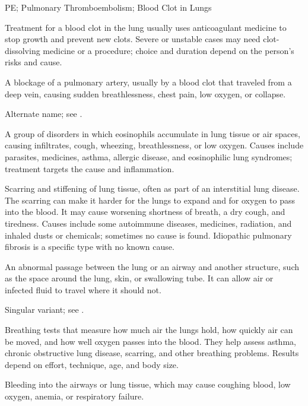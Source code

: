 
\synonyms
PE; Pulmonary Thromboembolism; Blood Clot in Lungs

 Treatment for a blood clot in the lung usually uses anticoagulant medicine to stop growth and prevent new clots. Severe or unstable cases may need clot-dissolving medicine or a procedure; choice and duration depend on the person’s risks and cause.

 A blockage of a pulmonary artery, usually by a blood clot that traveled from a deep vein, causing sudden breathlessness, chest pain, low oxygen, or collapse.

 Alternate name; see .

 A group of disorders in which eosinophils accumulate in lung tissue or air spaces, causing infiltrates, cough, wheezing, breathlessness, or low oxygen. Causes include parasites, medicines, asthma, allergic disease, and eosinophilic lung syndromes; treatment targets the cause and inflammation.

 Scarring and stiffening of lung tissue, often as part of an interstitial lung disease. The scarring can make it harder for the lungs to expand and for oxygen to pass into the blood. It may cause worsening shortness of breath, a dry cough, and tiredness. Causes include some autoimmune diseases, medicines, radiation, and inhaled dusts or chemicals; sometimes no cause is found. Idiopathic pulmonary fibrosis is a specific type with no known cause.

 An abnormal passage between the lung or an airway and another structure, such as the space around the lung, skin, or swallowing tube. It can allow air or infected fluid to travel where it should not.

 Singular variant; see .

 Breathing tests that measure how much air the lungs hold, how quickly air can be moved, and how well oxygen passes into the blood. They help assess asthma, chronic obstructive lung disease, scarring, and other breathing problems. Results depend on effort, technique, age, and body size.

 Bleeding into the airways or lung tissue, which may cause coughing blood, low oxygen, anemia, or respiratory failure.

